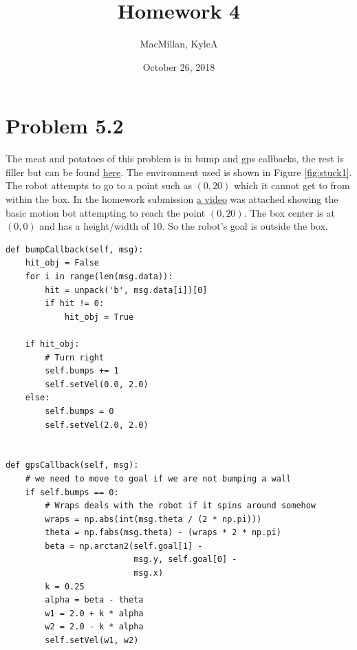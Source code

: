 \documentclass{article}
\title{\textbf{Homework 4}}
\author{MacMillan, KyleA}
\date{October 26, 2018}
\begin{document}
\maketitle

\newpage
\tableofcontents
{}
\newpage
\listoffigures
{}



\newpage
\hypersetup{
    colorlinks,
    citecolor=blue,
    filecolor=black,
    linkcolor=blue,
    urlcolor=blue
}

\setcounter{page}{1}
\newpage
\section{\textbf{Problem 5.2}}
The meat and potatoes of this problem is in bump and gps callbacks, the 
rest is filler but can be found \href{https://github.com/macattackftw/RoboticsHW/blob/master/HW4/Problem2.py}{here}. 
The environment used is shown in Figure \ref{fig:stuck1}. The robot attempts to 
go to a point such as $(0, 20)$ which it cannot get to from within the box. In 
the homework submission 
\href{https://drive.google.com/file/d/1aIZrLAZmhegsDObLa45E5CK3efqtNHIW/view?usp=sharing}{a video} 
was attached showing the basic motion bot attempting to reach the point 
$(0, 20)$. The box center is at $(0, 0)$ and has a height/width of 10. So the 
robot's goal is outside the box.

\begin{verbatim}
def bumpCallback(self, msg):
    hit_obj = False
    for i in range(len(msg.data)):
        hit = unpack('b', msg.data[i])[0]
        if hit != 0:
            hit_obj = True

    if hit_obj:
        # Turn right
        self.bumps += 1
        self.setVel(0.0, 2.0)
    else:
        self.bumps = 0
        self.setVel(2.0, 2.0)


def gpsCallback(self, msg):
    # we need to move to goal if we are not bumping a wall
    if self.bumps == 0:
        # Wraps deals with the robot if it spins around somehow
        wraps = np.abs(int(msg.theta / (2 * np.pi)))
        theta = np.fabs(msg.theta) - (wraps * 2 * np.pi)
        beta = np.arctan2(self.goal[1] -
                          msg.y, self.goal[0] -
                          msg.x)
        k = 0.25
        alpha = beta - theta
        w1 = 2.0 + k * alpha
        w2 = 2.0 - k * alpha
        self.setVel(w1, w2)

\end{verbatim}
\end{document}

